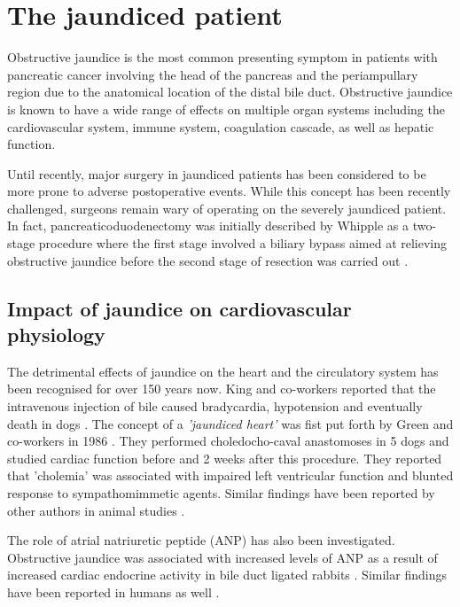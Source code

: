 \section{The jaundiced patient}

Obstructive jaundice is the most common presenting symptom in patients with pancreatic cancer involving the head of the pancreas and the periampullary region due to the anatomical location of the distal bile duct. 
Obstructive jaundice is known to have a wide range of effects on multiple organ systems including the cardiovascular system, immune system, coagulation cascade, as well as hepatic function.

Until recently, major surgery in jaundiced patients has been considered to be more prone to adverse postoperative events. 
While this concept has been recently challenged, surgeons remain wary of operating on the severely jaundiced patient. 
In fact, pancreaticoduodenectomy was initially described by Whipple as a two-stage procedure where the first stage involved a biliary bypass aimed at relieving obstructive jaundice before the second stage of resection was carried out \parencite{whipple_treatment_1935}.


\subsection{Impact of jaundice on cardiovascular physiology}

The detrimental effects of jaundice on the heart and the circulatory system has been recognised for over 150 years now. 
King and co-workers reported that the intravenous injection of bile caused bradycardia, hypotension and eventually death in dogs \parencite{king_effect_1909}. 
The concept of a \textit{'jaundiced heart'} was fist put forth by Green and co-workers in 1986 \parencite{green_jaundiced_1986}. 
They performed choledocho-caval anastomoses in 5 dogs and studied cardiac function before and 2 weeks after this procedure. 
They reported that 'cholemia' was associated with impaired left ventricular function and blunted response to sympathomimmetic agents. 
Similar findings have been reported by other authors in animal studies \parencite{binah_obstructive_1985,bomzon_systemic_1986}. 

The role of atrial natriuretic peptide (ANP) has also been investigated. 
Obstructive jaundice was associated with increased levels of ANP as a result of increased cardiac endocrine activity in bile duct ligated rabbits \parencite{pereira_increased_1994}. 
Similar findings have been reported in humans as well \parencite{gallardo_increased_1998, martinez-rodenas_circulating_1998}. 

